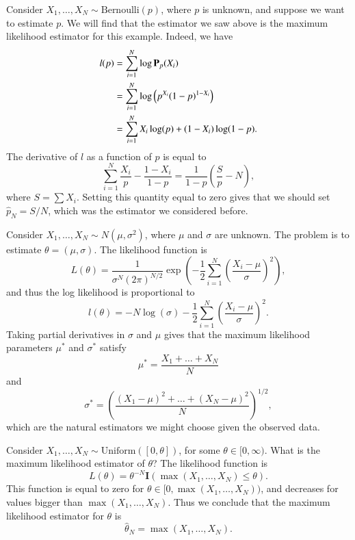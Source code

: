 \begin{example}
	Consider $X_1,\dots,X_N \sim \text{Bernoulli}(p)$, where $p$ is unknown, and suppose we want to estimate $p$. We will find that the estimator we saw above is the maximum likelihood estimator for this example. Indeed, we have
	\begin{align*}
		l(p) &= \sum_{i = 1}^N \log \operatorname{\mathbf{P}}_p(X_i)\\
		&= \sum_{i = 1}^N \log \left( p^{X_i} (1 - p)^{1 - X_i} \right)\\
		&= \sum_{i = 1}^N X_i \log(p) + (1 - X_i) \log(1 - p).
	\end{align*}
	The derivative of $l$ as a function of $p$ is equal to
	\[ \sum_{i = 1}^N \frac{X_i}{p} - \frac{1 - X_i}{1 - p} = \frac{1}{1 - p} \left( \frac{S}{p} - N \right), \]
	where $S = \sum X_i$. Setting this quantity equal to zero gives that we should set $\widehat{p}_N = S/N$, which was the estimator we considered before.
\end{example}

\begin{example}
	Consider $X_1,\dots,X_N \sim N(\mu,\sigma^2)$, where $\mu$ and $\sigma$ are unknown. The problem is to estimate $\theta = (\mu,\sigma)$. The likelihood function is
	\[ L(\theta) = \frac{1}{\sigma^N (2 \pi)^{N/2}} \exp \left( - \frac{1}{2} \sum_{i = 1}^N \left( \frac{X_i - \mu}{\sigma} \right)^2 \right), \]
	and thus the log likelihood is proportional to
	\[ l(\theta) = -N \log(\sigma) - \frac{1}{2} \sum_{i = 1}^N \left( \frac{X_i - \mu}{\sigma} \right)^2. \]
	Taking partial derivatives in $\sigma$ and $\mu$ gives that the maximum likelihood parameters $\mu^*$ and $\sigma^*$ satisfy
	\[ \mu^* = \frac{X_1 + \dots + X_N}{N} \]
	and
	\[ \sigma^* = \left( \frac{(X_1 - \mu)^2 + \dots + (X_N - \mu)^2}{N} \right)^{1/2}, \]
	which are the natural estimators we might choose given the observed data.
\end{example}

\begin{example}
	Consider $X_1,\dots,X_N \sim \text{Uniform}([0,\theta])$, for some $\theta \in [0,\infty)$. What is the maximum likelihood estimator of $\theta$? The likelihood function is
	\[ L(\theta) = \theta^{-N} \mathbf{I}(\max(X_1,\dots,X_N) \leq \theta). \]
	This function is equal to zero for $\theta \in [0,\max(X_1,\dots,X_N))$, and decreases for values bigger than $\max(X_1,\dots,X_N)$. Thus we conclude that the maximum likelihood estimator for $\theta$ is
	\[ \widehat{\theta}_N = \max(X_1,\dots,X_N). \]
\end{example}

